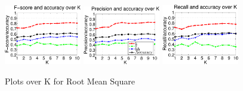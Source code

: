 \begin{figure}

	\centering\includegraphics[width=0.3\textwidth]{rms11FP.png}
	\centering\includegraphics[width=0.3\textwidth]{rms11_P.png}
	\centering\includegraphics[width=0.3\textwidth]{rms11_R.png}
	
	\caption{Plots over K for Root Mean Square}
\end{figure}


